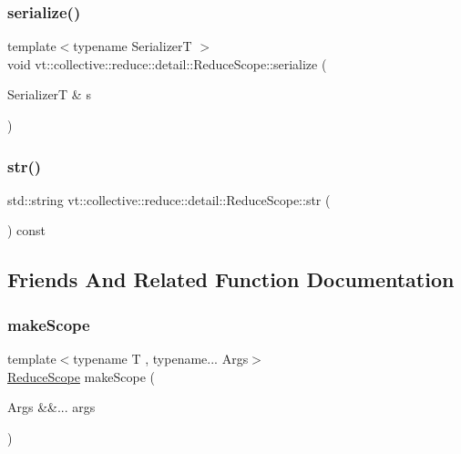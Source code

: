 \subsubsection{\texorpdfstring{serialize()}{serialize()}}
{\footnotesize\ttfamily template$<$typename SerializerT $>$ \\
void vt\+::collective\+::reduce\+::detail\+::\+Reduce\+Scope\+::serialize (\begin{DoxyParamCaption}\item[{SerializerT \&}]{s }\end{DoxyParamCaption})\hspace{0.3cm}{\ttfamily [inline]}}

\mbox{\label{structvt_1_1collective_1_1reduce_1_1detail_1_1_reduce_scope_a8fbbaff85c592424bedc8daf5fce7e02}} 
\subsubsection{\texorpdfstring{str()}{str()}}
{\footnotesize\ttfamily std\+::string vt\+::collective\+::reduce\+::detail\+::\+Reduce\+Scope\+::str (\begin{DoxyParamCaption}{ }\end{DoxyParamCaption}) const\hspace{0.3cm}{\ttfamily [inline]}}



\subsection{Friends And Related Function Documentation}
\mbox{\label{structvt_1_1collective_1_1reduce_1_1detail_1_1_reduce_scope_affabcae30d44dc7901117edf23a14884}} 
\subsubsection{\texorpdfstring{make\+Scope}{makeScope}}
{\footnotesize\ttfamily template$<$typename T , typename... Args$>$ \\
\hyperlink{structvt_1_1collective_1_1reduce_1_1detail_1_1_reduce_scope}{Reduce\+Scope} make\+Scope (\begin{DoxyParamCaption}\item[{Args \&\&...}]{args }\end{DoxyParamCaption})\hspace{0.3cm}{\ttfamily [friend]}}



